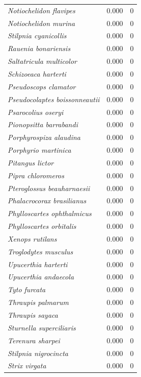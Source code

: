 \documentclass[12pt,a4paper]{article}
\begin{document}
\begin{longtable}{p{6.2cm}cr}
  \textit{Notiochelidon flavipes} & 0.000 & 0 \\
  \textit{Notiochelidon murina} & 0.000 & 0 \\
  \textit{Stilpnia cyanicollis} & 0.000 & 0 \\
  \textit{Rauenia bonariensis} & 0.000 & 0 \\
  \textit{Saltatricula multicolor} & 0.000 & 0 \\
  \textit{Schizoeaca harterti} & 0.000 & 0 \\
  \textit{Pseudoscops clamator} & 0.000 & 0 \\
  \textit{Pseudocolaptes boissonneautii} & 0.000 & 0 \\
  \textit{Psarocolius oseryi} & 0.000 & 0 \\
  \textit{Pionopsitta barrabandi} & 0.000 & 0 \\
  \textit{Porphyrospiza alaudina} & 0.000 & 0 \\
  \textit{Porphyrio martinica} & 0.000 & 0 \\
  \textit{Pitangus lictor} & 0.000 & 0 \\
  \textit{Pipra chloromeros} & 0.000 & 0 \\
  \textit{Pteroglossus beauharnaesii} & 0.000 & 0 \\
  \textit{Phalacrocorax brasilianus} & 0.000 & 0 \\
  \textit{Phylloscartes ophthalmicus} & 0.000 & 0 \\
  \textit{Phylloscartes orbitalis} & 0.000 & 0 \\
  \textit{Xenops rutilans} & 0.000 & 0 \\
  \textit{Troglodytes musculus} & 0.000 & 0 \\
  \textit{Upucerthia harterti} & 0.000 & 0 \\
  \textit{Upucerthia andaecola} & 0.000 & 0 \\
  \textit{Tyto furcata} & 0.000 & 0 \\
  \textit{Thraupis palmarum} & 0.000 & 0 \\
  \textit{Thraupis sayaca} & 0.000 & 0 \\
  \textit{Sturnella superciliaris} & 0.000 & 0 \\
  \textit{Terenura sharpei} & 0.000 & 0 \\
  \textit{Stilpnia nigrocincta} & 0.000 & 0 \\
  \textit{Strix virgata} & 0.000 & 0 \\
\end{longtable}
\end{document}
